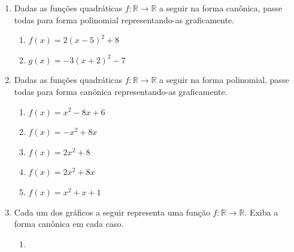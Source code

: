 \begin{enumerate}
\item Dadas as funções quadráticas \(f:\mathbb{R}\to\mathbb{R}\) a seguir na forma canônica, passe todas para forma polinomial representando-as graficamente.
\begin{enumerate}
\item {} 
\(f(x)=2(x-5)^2+8\)

\item {} 
\(g(x)=-3(x+2)^2-7\)

\end{enumerate}

\item Dadas as funções quadráticas \(f:\mathbb{R}\to\mathbb{R}\) a seguir na forma polinomial, passe todas para forma canônica representando-as graficamente.
\begin{enumerate}
\item {} 
\(f(x) = x^2-8x+6\)

\item {} 
\(f(x) = -x^2+8x\)

\item {} 
\(f(x) = 2x^2+8\)

\item {} 
\(f(x) = 2x^2+8x\)

\item {} 
\(f(x) = x^2+x+1\)

\end{enumerate}

\item Cada um dos gráficos a seguir representa uma função \(f:\mathbb{R}\to\mathbb{R}\). Exiba a forma canônica em cada caso.
\begin{multicols}{2}
\begin{enumerate}
\item 




\end{enumerate}
\end{multicols}
\end{enumerate}
